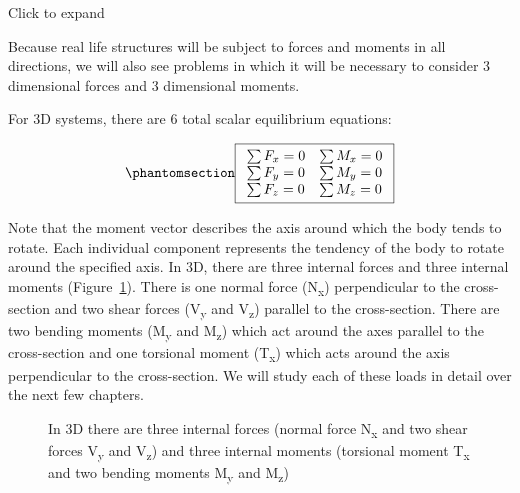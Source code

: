 \documentclass[
  letterpaper,
  DIV=11,
  numbers=noendperiod]{scrreprt}
\theoremstyle{definition}
\theoremstyle{remark}
\begin{document}
Click to expand

Because real life structures will be subject to forces and moments in
all directions, we will also see problems in which it will be necessary
to consider 3 dimensional forces and 3 dimensional moments.

For 3D systems, there are 6 total scalar equilibrium equations:

\begin{equation}\phantomsection\label{eq-1.2}{
\boxed{\begin{array}{ll}
\sum F_x=0 & \sum M_x=0 \\
\sum F_y=0 & \sum M_y=0 \\
\sum F_z=0 & \sum M_z=0
\end{array}}
}\end{equation}

Note that the moment vector describes the axis around which the body
tends to rotate. Each individual component represents the tendency of
the body to rotate around the specified axis. In 3D, there are three
internal forces and three internal moments (Figure~\ref{fig-1.3}). There
is one normal force (N\textsubscript{x}) perpendicular to the
cross-section and two shear forces (V\textsubscript{y} and
V\textsubscript{z}) parallel to the cross-section. There are two bending
moments (M\textsubscript{y} and M\textsubscript{z}) which act around the
axes parallel to the cross-section and one torsional moment
(T\textsubscript{x}) which acts around the axis perpendicular to the
cross-section. We will study each of these loads in detail over the next
few chapters.

\begin{figure}


\caption{\label{fig-1.3}In 3D there are three internal forces (normal
force N\textsubscript{x} and two shear forces V\textsubscript{y} and
V\textsubscript{z}) and three internal moments (torsional moment
T\textsubscript{x} and two bending moments M\textsubscript{y} and
M\textsubscript{z})}

\end{figure}%
\end{document}
